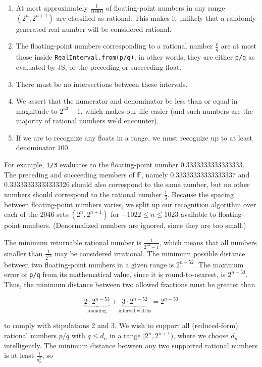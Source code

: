 \documentclass{article}
\newcommand{\finitefp}{\mathbb{F}}
\begin{document}
\begin{enumerate}
  \item At most approximately $\frac{1}{10000}$ of floating-point numbers in any range $\left(2^n, 2^{n+1}\right)$ are classified as rational. This makes it unlikely that a randomly-generated real number will be considered rational.
  \item The floating-point numbers corresponding to a rational number $\frac{p}{q}$ are at most those inside \texttt{RealInterval.from(p/q)}; in other words, they are either \texttt{p/q} as evaluated by JS, or the preceding or succeeding float.
  \item There must be no intersections between these intervals.
  \item We assert that the numerator and denominator be less than or equal in magnitude to $2^{53}-1$, which makes our life easier (and such numbers are the majority of rational numbers we'd encounter).
  \item If we are to recognize any floats in a range, we must recognize up to at least denominator $100$.
\end{enumerate}

For example, \texttt{1/3} evaluates to the floating-point number $0.3333333333333333$. The preceding and succeeding members of $\finitefp$, namely $0.33333333333333337$ and $0.33333333333333326$ should also correspond to the same number, but no other numbers should correspond to the rational number $\frac{1}{3}$. Because the spacing between floating-point numbers varies, we split up our recognition algorithm over each of the $2046$ sets $\left(2^n, 2^{n+1}\right)$ for $-1022\leq n\leq 1023$ available to floating-point numbers. (Denormalized numbers are ignored, since they are too small.)

The minimum returnable rational number is $\frac{1}{2^{53}-1}$, which means that all numbers smaller than $\frac{1}{2^{53}}$ may be considered irrational. The minimum possible distance between two floating-point numbers in a given range is $2^{n-52}$. The maximum error of \texttt{p/q} from its mathematical value, since it is round-to-nearest, is $2^{n-53}$. Thus, the minimum distance between two allowed fractions must be greater than

$$\underbrace{2\cdot 2^{n-53}}_{\text{rounding}}+\underbrace{3\cdot 2^{n-52}}_{\text{interval widths}} = 2^{n-50}$$

to comply with stipulations 2 and 3. We wish to support all (reduced-form) rational numbers $p/q$ with $q \leq d_n$ in a range $[2^n, 2^{n+1})$, where we choose $d_n$ intelligently. The minimum distance between any two supported rational numbers is at least $\frac{1}{d_n^2}$, so
\end{document}
